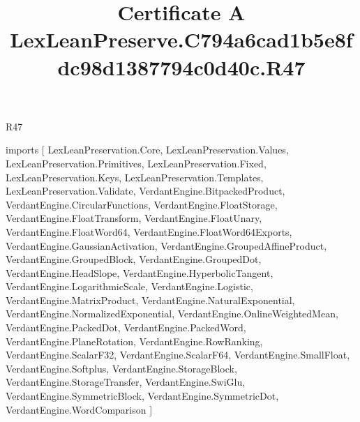 \begin{lexlean}{R47}
\title{Certificate A LexLeanPreserve.C794a6cad1b5e8fdc98d1387794c0d40c.R47}
\begin{coremodule}
imports [
  LexLeanPreservation.Core,
  LexLeanPreservation.Values,
  LexLeanPreservation.Primitives,
  LexLeanPreservation.Fixed,
  LexLeanPreservation.Keys,
  LexLeanPreservation.Templates,
  LexLeanPreservation.Validate,
  VerdantEngine.BitpackedProduct,
  VerdantEngine.CircularFunctions,
  VerdantEngine.FloatStorage,
  VerdantEngine.FloatTransform,
  VerdantEngine.FloatUnary,
  VerdantEngine.FloatWord64,
  VerdantEngine.FloatWord64Exports,
  VerdantEngine.GaussianActivation,
  VerdantEngine.GroupedAffineProduct,
  VerdantEngine.GroupedBlock,
  VerdantEngine.GroupedDot,
  VerdantEngine.HeadSlope,
  VerdantEngine.HyperbolicTangent,
  VerdantEngine.LogarithmicScale,
  VerdantEngine.Logistic,
  VerdantEngine.MatrixProduct,
  VerdantEngine.NaturalExponential,
  VerdantEngine.NormalizedExponential,
  VerdantEngine.OnlineWeightedMean,
  VerdantEngine.PackedDot,
  VerdantEngine.PackedWord,
  VerdantEngine.PlaneRotation,
  VerdantEngine.RowRanking,
  VerdantEngine.ScalarF32,
  VerdantEngine.ScalarF64,
  VerdantEngine.SmallFloat,
  VerdantEngine.Softplus,
  VerdantEngine.StorageBlock,
  VerdantEngine.StorageTransfer,
  VerdantEngine.SwiGlu,
  VerdantEngine.SymmetricBlock,
  VerdantEngine.SymmetricDot,
  VerdantEngine.WordComparison
]


\end{coremodule}
\end{lexlean}
